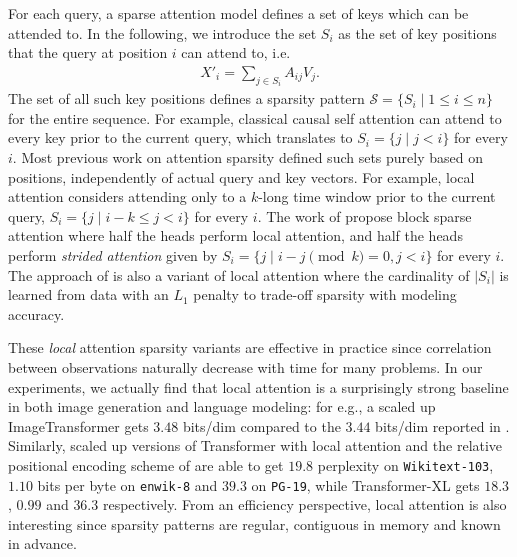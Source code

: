 \documentclass[a4paper]{article}
\begin{document}
For each query, a sparse attention model defines a set of keys which can be attended to.
In the following, we introduce the set $S_i$ as the set of key positions that the query at 
position $i$ can attend to, i.e.
\begin{align}
X'_i = 
    \sum_{j \in S_i} A_{ij} V_j.
\end{align}
The set of all such key positions defines a sparsity pattern \(\mathcal{S} = \{S_i \mid 
1 \le i \le n\}\) for the entire sequence.
For example, classical causal self attention can attend to every key prior to the current
query, which translates to $S_i = \{ j \mid j < i\}$ for every \(i\).
Most previous work on attention sparsity defined such sets purely based on positions, 
independently of actual query and key vectors. For example, local attention \citep{luong2015effective} considers attending only to a $k$-long time window 
prior to the current query, 
\(S_i = \{j \mid i - k \le j < i\}\) for every \(i\). 
The work of \citet{child2019generating} propose block
sparse attention where half the heads perform local attention, and half the heads perform \emph{strided attention} given by \(S_i = \{j \mid i - j \pmod k = 0, j < i\}\)
for every \(i\). 
The approach of \citet{sukhbaatar2019adaptive} is also a variant of local attention where the 
cardinality of $|S_i|$ is learned from data with an $L_1$ penalty to trade-off 
sparsity with modeling accuracy.

These \emph{local} attention sparsity variants are effective in practice since
correlation between observations naturally decrease with time for many problems.
In our experiments, we actually find that local attention is a surprisingly 
strong baseline in both image generation and language modeling: for e.g., a 
scaled up ImageTransformer \citep{parmar2018image}  gets \(3.48\) bits/dim 
compared to the \(3.44\) bits/dim reported in \citet{child2019generating}.
Similarly, scaled up versions of Transformer with local attention and the relative
positional encoding scheme of \citet{shaw2018self} are able to get \(19.8\) perplexity on 
\texttt{Wikitext-103}, \(1.10\) bits per byte on \texttt{enwik-8} and \(39.3\) on \texttt{PG-19},
while Transformer-XL \citep{dai2019transformer} gets \(18.3\), \(0.99\) and \(36.3\) respectively. 
From an efficiency perspective, local attention is
also interesting since sparsity patterns are regular, contiguous in memory and 
known in advance.
\end{document}
